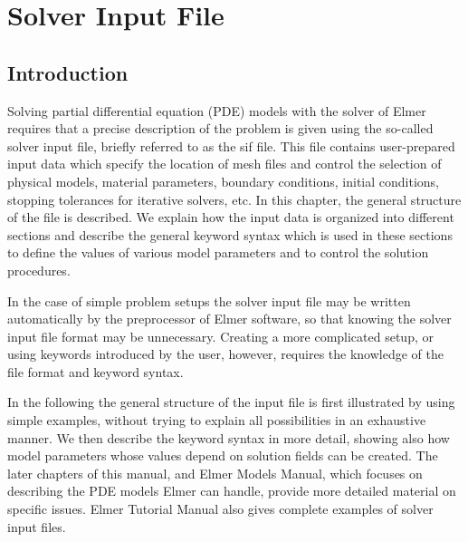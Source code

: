 \chapter{Solver Input File}
\noindent
                                                                                                                 
\section{Introduction}

Solving partial differential equation (PDE) models with the solver of Elmer
requires that a precise description of the problem is given using 
the so-called solver input file, briefly referred to as the sif file. 
This file contains user-prepared input data which specify the location of mesh files and 
control the selection of physical models, material parameters, boundary conditions, 
initial conditions, stopping tolerances for iterative solvers, etc. 
In this chapter, the general structure of the file is described. We explain
how the input data is organized into different sections and describe the general keyword syntax 
which is used in these sections to define the values of various model parameters and to control
the solution procedures.

In the case of simple problem setups the solver input file may be written automatically by 
the preprocessor of Elmer software, so that knowing the solver input file format may be unnecessary.
Creating a more complicated setup, or using keywords introduced by the user, however, requires 
the knowledge of the file format and keyword syntax. 

In the following the general structure of the input file is first illustrated by using simple examples,
without trying to explain all possibilities in an exhaustive manner.
We then describe the keyword syntax in more detail, showing also how model parameters 
whose values depend on solution fields can be created. The later chapters of this manual, 
and Elmer Models Manual, which focuses on describing the PDE models Elmer can handle, provide more
detailed material on specific issues. Elmer Tutorial Manual also gives complete
examples of solver input files.


